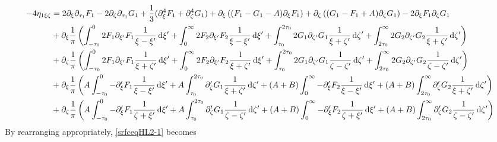 \documentclass[10pt,reqno,oneside,a4paper, landscape]{article}
\begin{document}
\begin{equation}\label{srfceqHL2-1}
\begin{aligned}
- 4\eta_{1\xi \zeta} &= 2 \partial_\xi \partial_{\tau_1}F_1 - 2\partial_{\zeta} \partial_{\tau_1}G_1  + \frac{1}{3}(\partial_\xi^4 F_1 + \partial_\zeta^4 G_1) + \partial_\xi \left( (F_1 - G_1 - A) \partial_\xi F_1 \right) + \partial_\zeta \left((G_1 - F_1 + A)\partial_\zeta G_1 \right) - 2 \partial_\xi F_1\partial_\zeta G_1 \\
&+ \partial_\xi \frac{1}{\pi} \left( \int^0_{-\tau_0} 2 F_1 \partial_{\xi'} F_1 \frac{1}{\xi -\xi'} \,\mathrm{d} \xi' + \int^{\infty}_{0} 2 F_2 \partial_{\xi'} F_2 \frac{1}{\xi -\xi'} \,\mathrm{d} \xi' + \int^{2\tau_0}_{\tau_0} 2 G_1 \partial_{\zeta'} G_1 \frac{1}{\xi + \zeta'} \,\mathrm{d} \zeta' + \int^{\infty}_{2\tau_0} 2 G_2 \partial_{\zeta'} G_2 \frac{1}{\xi + \zeta'} \,\mathrm{d} \zeta' \right) \\
&+ \partial_\zeta \frac{1}{\pi} \left( \int^0_{-\tau_0} 2 F_1 \partial_{\xi'} F_1 \frac{1}{\xi + \zeta'} \,\mathrm{d} \xi' + \int^{\infty}_{0} 2 F_2 \partial_{\xi'} F_2 \frac{1}{\xi + \zeta'} \,\mathrm{d} \xi' + \int^{2\tau_0}_{\tau_0} 2 G_1 \partial_{\zeta'} G_1 \frac{1}{\zeta -\zeta'} \,\mathrm{d} \zeta' + \int^{\infty}_{2\tau_0} 2 G_2 \partial_{\zeta'} G_2 \frac{1}{\zeta -\zeta'} \,\mathrm{d} \zeta' \right) \\
&+ \partial_\xi  \frac{1}{\pi} \left( A \int^0_{-\tau_0} -\partial_\xi' F_1 \frac{1}{\xi - \xi'} \,\mathrm{d} \xi' + A\int^{2\tau_0}_{\tau_0} \partial_\zeta' G_1 \frac{1}{\xi + \zeta'} \,\mathrm{d} \zeta' + (A+B)\int_0^{\infty} -\partial_\xi' F_2 \frac{1}{\xi - \xi'} \,\mathrm{d} \xi' + (A+B) \int_{2\tau_0}^{\infty} \partial_\zeta' G_2 \frac{1}{\xi + \zeta'} \,\mathrm{d} \zeta' \right) \\
&+ \partial_\zeta \frac{1}{\pi}  \left( A \int^0_{-\tau_0} -\partial_\xi' F_1  \frac{1}{\zeta + \xi'}  \,\mathrm{d} \xi' + A \int^{2\tau_0}_{\tau_0} \partial_\zeta' G_1 \frac{1}{\zeta - \zeta'} \,\mathrm{d} \zeta' + (A+B) \int_0^{\infty} -\partial_\xi' F_2  \frac{1}{\zeta + \xi'} \,\mathrm{d} \xi'  + (A+B) \int_{2\tau_0}^{\infty} \partial_\zeta' G_2 \frac{1}{\zeta - \zeta'}\,\mathrm{d} \zeta' \right)
\end{aligned}
\end{equation}
By rearranging appropriately, \eqref{srfceqHL2-1} becomes
\end{document}
